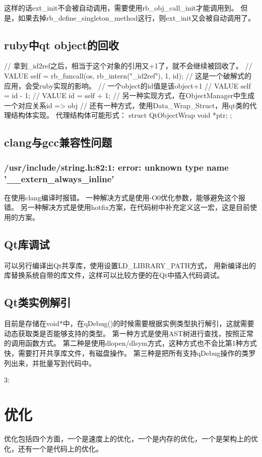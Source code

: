 这样的话ext\_init不会被自动调用，需要使用rb\_obj\_call\_init才能调用到。
但是，如果去掉rb\_define\_singleton\_method这行，则ext\_init又会被自动调用了。

\section{ruby中qt object的回收}
// 拿到_id2ref之后，相当于这个对象的引用又+1了，就不会继续被回收了。
// VALUE self = rb_funcall(os, rb_intern("_id2ref"), 1, id);
// 这是一个破解式的应用，会受ruby实现的影响。
// 一个object的id值是该object+1
// VALUE self = id - 1;
// VALUE id = self + 1;
// 另一种实现方式，在ObjectManager中生成一个对应关系id => obj
// 还有一种方式，使用Data\_Wrap\_Struct，用qt类的代理结构体实现。
代理结构体可能形式：
struct QtObjectWrap {
    void *ptr;
};

\section{clang与gcc兼容性问题}
\subsection{/usr/include/string.h:82:1: error: unknown type name '\_\_extern\_always\_inline'}
在使用clang编译时报错。
一种解决方式是使用-O0优化参数，能够避免这个报错。
另一种解决方式是使用hotfix方案，在代码树中补充定义这一宏，这是目前使用的方案。

\section{Qt库调试}
可以另行编译出Qt共享库，使用设置LD\_LIBRARY\_PATH方式，
用新编译出的库替换系统自带的库文件，这样可以比较方便的在Qt中插入代码调试。

\section{Qt类实例解引}
目前是存储在void*中，在qDebug()的时候需要根据实例类型执行解引，这就需要动态获取类是否能够支持的类型。
第一种方式是使用AST树进行查找，按照正常的调用函数方式。
第二种是使用dlopen/dlsym方式，这种方式也不会比第1种方式快，需要打开共享库文件，有磁盘操作。
第三种是把所有支持qDebug操作的类罗列出来，并批量写到代码中。

3:

\chapter{优化}
优化包括四个方面，一个是速度上的优化，一个是内存的优化，一个是架构上的优化，还有一个是代码上的优化。
